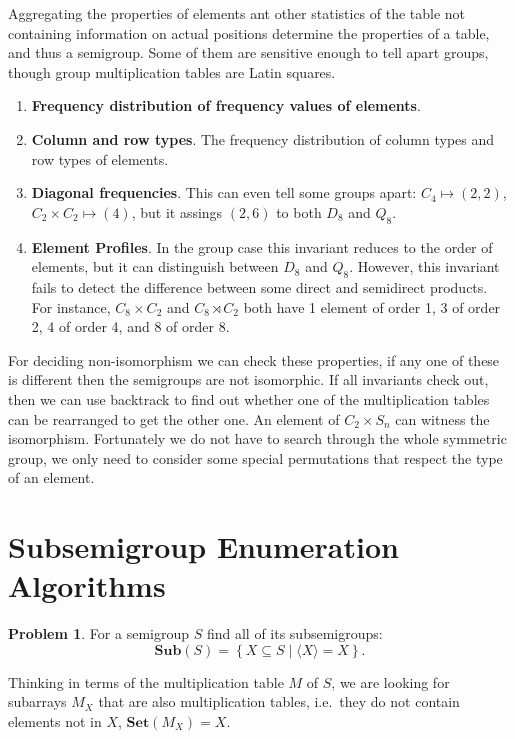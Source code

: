 \documentclass{amsart}
\newcommand{\Sub}{\mathbf{Sub}}
\newcommand{\Set}{\mathbf{Set}}
\theoremstyle{plain}
\theoremstyle{definition}
\newtheorem{problem}[theorem]{Problem}
\begin{document}
Aggregating the properties of elements ant other statistics of the table not containing information on actual positions determine the properties of a table, and thus a semigroup. Some of them are sensitive enough to tell apart groups, though group multiplication tables are Latin squares.
\begin{enumerate}
\item\textbf{Frequency distribution of frequency values of elements}. %
\item\textbf{Column and row types}. The frequency distribution of column types and row types of elements. %
\item \textbf{Diagonal frequencies}. This can even tell some groups apart: $C_4\mapsto (2,2)$, $C_2\times C_2\mapsto (4)$, but it assings $(2,6)$ to both $D_8$ and $Q_8$.
\item \textbf{Element Profiles}. In the group case this invariant reduces to the order of elements, but it can distinguish between $D_8$ and $Q_8$. However, this invariant fails to detect the difference between some direct and semidirect products. For instance, $C_8\times C_2$ and $C_8\rtimes C_2$ both have 1 element of order 1, 3 of order 2, 4 of order 4, and 8 of order 8.
\end{enumerate} 

For deciding non-isomorphism we can check these properties, if any one of these is different then the semigroups are not isomorphic.
If all invariants check out, then we can use backtrack to find out whether one of the multiplication tables can be rearranged to get the other one.
An element of $C_2\times S_n$ can witness the isomorphism.
Fortunately we do not have to search through the whole symmetric group, we only need to consider some special permutations that respect the type of an element.

\section{Subsemigroup Enumeration Algorithms}
\label{sec:enum}

\begin{problem}
For a semigroup $S$ find all of its subsemigroups:
$$\Sub(S)=\left\{ X\subseteq S\mid \langle X\rangle=X\right\}.$$
\end{problem}
Thinking in terms of the multiplication table $M$ of $S$, we are looking for subarrays $M_X$ that are also multiplication tables, i.e.\ they do not contain elements not in $X$, $\Set(M_X)=X$.
\end{document}
